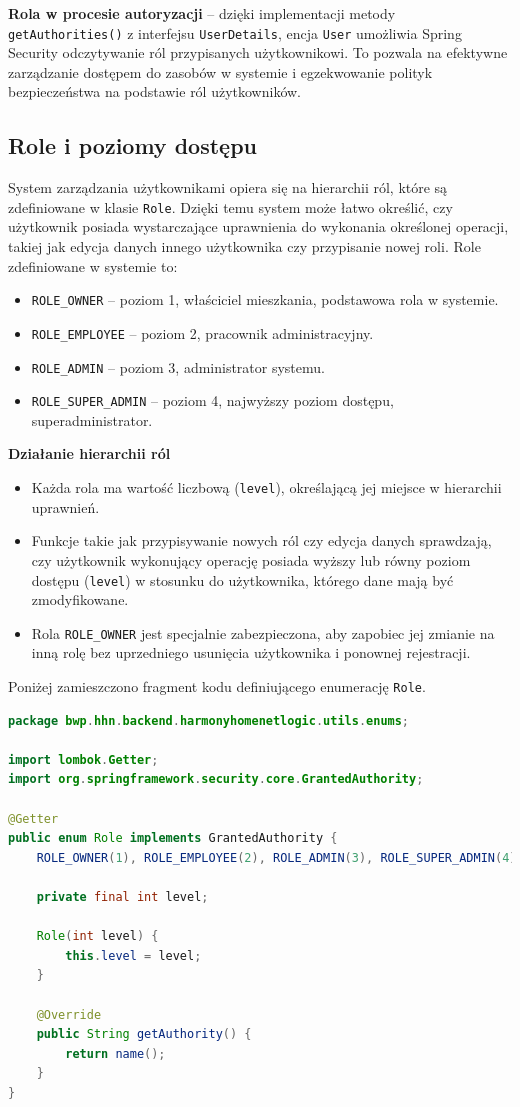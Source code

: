 \textbf{Rola w procesie autoryzacji} -- dzięki implementacji metody \texttt{getAuthorities()} z interfejsu \texttt{UserDetails}, encja \texttt{User} umożliwia Spring Security odczytywanie ról przypisanych użytkownikowi. To pozwala na efektywne zarządzanie dostępem do zasobów w systemie i egzekwowanie polityk bezpieczeństwa na podstawie ról użytkowników.


\subsection{Role i poziomy dostępu}

System zarządzania użytkownikami opiera się na hierarchii ról, które są zdefiniowane w klasie \texttt{Role}. Dzięki temu system może łatwo określić, czy użytkownik posiada wystarczające uprawnienia do wykonania określonej operacji, takiej jak edycja danych innego użytkownika czy przypisanie nowej roli. Role zdefiniowane w systemie to:
\begin{itemize}
    \item \texttt{ROLE\_OWNER} -- poziom 1, właściciel mieszkania, podstawowa rola w systemie.
    \item \texttt{ROLE\_EMPLOYEE} -- poziom 2, pracownik administracyjny.
    \item \texttt{ROLE\_ADMIN} -- poziom 3, administrator systemu.
    \item \texttt{ROLE\_SUPER\_ADMIN} -- poziom 4, najwyższy poziom dostępu, superadministrator.
\end{itemize}
\noindent \textbf{Działanie hierarchii ról}
\begin{itemize}
    \item Każda rola ma wartość liczbową (\texttt{level}), określającą jej miejsce w hierarchii uprawnień.
    \item Funkcje takie jak przypisywanie nowych ról czy edycja danych sprawdzają, czy użytkownik wykonujący operację posiada wyższy lub równy poziom dostępu (\texttt{level}) w stosunku do użytkownika, którego dane mają być zmodyfikowane.
    \item Rola \texttt{ROLE\_OWNER} jest specjalnie zabezpieczona, aby zapobiec jej zmianie na inną rolę bez uprzedniego usunięcia użytkownika i ponownej rejestracji.
\end{itemize}
Poniżej zamieszczono fragment kodu definiującego enumerację \texttt{Role}.
\begin{lstlisting}[language=Java, style=JavaStyle, caption=Definicja ról w systemie \texttt{Role}]
package bwp.hhn.backend.harmonyhomenetlogic.utils.enums;

import lombok.Getter;
import org.springframework.security.core.GrantedAuthority;

@Getter
public enum Role implements GrantedAuthority {
    ROLE_OWNER(1), ROLE_EMPLOYEE(2), ROLE_ADMIN(3), ROLE_SUPER_ADMIN(4);

    private final int level;

    Role(int level) {
        this.level = level;
    }

    @Override
    public String getAuthority() {
        return name();
    }
}
\end{lstlisting}




